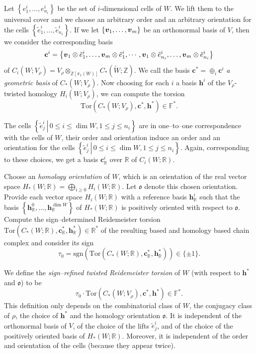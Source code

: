 \documentclass[a4paper]{amsart}
\theoremstyle{plain}
\theoremstyle{definition}
\theoremstyle{remark}
\newcommand{\mf}[1]{\mathfrak{#1}}
\newcommand{\myleq}{\leqslant}
\newcommand{\mygeq}{\geqslant}
\newcommand{\ZZ}{{\mathbb Z}}
\newcommand{\IR}{{\mathbb R}}
\newcommand{\FF}{{\mathbb F}}
\newcommand{\bm}[1]{\mbox{\boldmath $#1$}}
\newcommand{\Tor}[3]{\mathrm{Tor} ({#1}, {#2}, {#3})}
\newcommand{\cbasis}[2][c]{\mathbf{#1}^{#2}}
\newcommand{\hbasis}[2][h]{\mathbf{#1}^{#2}}
\newcommand{\ucover}[1]{\widetilde{#1}}
\begin{document}
Let $\left\{e^{i}_1, \ldots, e^{i}_{n_i}\right\}$ be the set of
$i$-dimensional cells of $W$. We lift them to the universal cover and
we choose an arbitrary order and an arbitrary orientation for the
cells $\left\{ {\tilde{e}^{i}_1, \ldots, \tilde{e}^{i}_{n_i}}
\right\}$. If we let $\{\bm{v}_1, \ldots, \bm{v}_m\}$ be an
orthonormal basis of $V$, then we consider the corresponding basis
$$
\cbasis{i} = 
  \left\{ 
    \bm{v}_1 \otimes \tilde{e}^{i}_{1} , 
    \ldots, 
    \bm{v}_m \otimes \tilde{e}^{i}_{1}, 
    \cdots, 
    \bm{v}_1 \otimes \tilde{e}^{i}_{n_i}, 
    \ldots, 
    \bm{v}_m \otimes \tilde{e}^{i}_{n_i}
  \right\}
$$ 
of 
$C_i(W; V_\rho) = V_\rho \otimes_{\ZZ[\pi_1(W)]} C_*(\ucover{W};\ZZ)$. 
We call the basis $\cbasis{*} = \oplus_{i} \cbasis{i}$ 
{\it a geometric basis} of $C_*(W;V_\rho)$.
Now choosing for each $i$ a basis $\hbasis{i}$ of the
$V_\rho$-twisted homology $H_i(W; V_\rho)$, we can compute the torsion
$$\Tor{C_*(W; V_\rho)}{\cbasis{*}}{\hbasis{*}} \in \FF^*.$$

The cells 
$\left\{ \left. 
  \tilde{e}^{i}_j \, 
         \right|\, 
  0 \myleq i \myleq \dim W, 
  1 \myleq j \myleq n_i
\right\}$ are in one--to--one correspondence with the cells of $W$, 
their order and orientation induce an order and 
an orientation for the cells 
$\left\{ \left. 
  \tilde{e}^{i}_j \,
         \right|\, 
  0 \myleq i \myleq \dim W, 
  1 \myleq j \myleq n_i
\right\}$. 
Again, corresponding to these
choices, we get a basis $\cbasis{i}_\IR$ over $\IR$ of $C_i(W; \IR)$.

Choose an \emph{homology orientation} of $W$, which is an orientation
of the real vector space $H_*(W; \IR) = \bigoplus_{i\mygeq 0}
H_i(W; \IR)$. Let $\mf{o}$ denote this chosen
orientation. Provide each vector space $H_i(W; \IR)$ with a reference
basis $\hbasis{i}_\IR$ such that the basis 
$\left\{ {\hbasis{0}_\IR, \ldots, \hbasis{\dim W}_\IR} \right\}$ of 
$H_*(W; \IR)$ is {positively oriented} with respect to $\mf{o}$. 
Compute the sign--determined Reidemeister torsion 
$\Tor{C_*(W; \IR)}{\cbasis{*}_\IR}{\hbasis{*}_\IR} \in \IR^*$ of 
the resulting based and homology based chain complex and consider its sign 
$$\tau_0 =
  \mathrm{sgn}\left(
    \Tor{C_*(W; \IR)}{\cbasis{*}_\IR}{\hbasis{*}_\IR}
   \right)
\in \{\pm 1\}.$$

We define the \emph{sign--refined twisted Reidemeister torsion} of $W$
{(with respect to $\hbasis{*}$ and $\mf{o}$)} to be
\begin{equation}\label{eqn:TorsionRaff}
  \tau_0 \cdot 
  \Tor{C_*(W; V_\rho)}{\cbasis{*}}{\hbasis{*}} \in \FF^*.
\end{equation}
This definition only depends on the combinatorial class of $W$, the
conjugacy class of $\rho$, the choice of $\hbasis{*}$ and the
{homology} orientation $\mf{o}$. It is independent of the
orthonormal basis of $V$, of the choice of the lifts
$\tilde{e}^{i}_j$, and of the choice of the positively oriented basis
of $H_*(W; \IR)$. Moreover, it is independent of the order and
orientation of the cells (because they appear twice).
\end{document}
